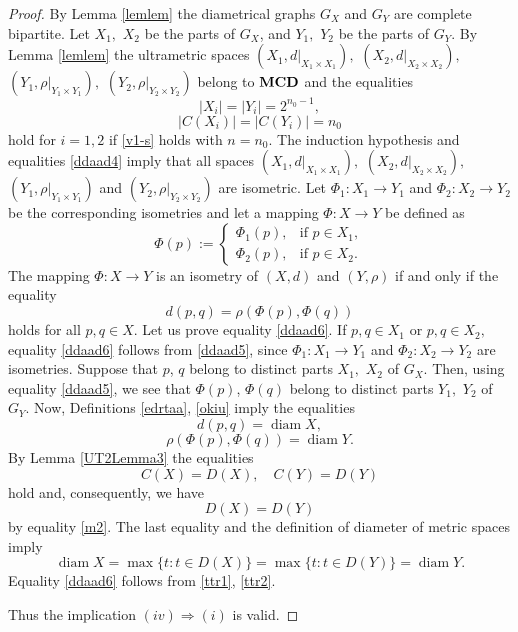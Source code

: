 \documentclass[10pt,a4paper]{amsart}
\begin{document}
\begin{proof}
By Lemma \ref{lemlem} the diametrical graphs
$G_X$ and $G_Y$ are complete bipartite. Let $X_1,$ $X_2$ be the parts of
$G_X$, and $Y_1,$ $Y_2$ be the parts of $G_Y$. By Lemma \ref{lemlem} the
ultrametric spaces
\(
(X_1,d|_{X_1\times X_1}),\)
\((X_2,d|_{X_2\times X_2}),\)
\((Y_1,\rho|_{Y_1\times Y_1}),\)
\((Y_2,\rho|_{Y_2\times Y_2})
\)
belong to ${\bf MCD}$ and the equalities
\begin{equation*}
    |X_i|=|Y_i|=2^{n_0-1},
\end{equation*}
\begin{equation}
    \label{ddaad4}
    |C(X_i)|=|C(Y_i)|=n_0
\end{equation}
hold for $i=1,2$ if \eqref{v1-s} holds with $n=n_0$.
The induction hypothesis and equalities \eqref{ddaad4} imply that all spaces
\(
(X_1,d|_{X_1\times X_1}),
\)
\(
(X_2,d|_{X_2\times X_2}),
\)
\(
(Y_1,\rho|_{Y_1\times Y_1})
\) and \(
(Y_2,\rho|_{Y_2\times Y_2})
\)
are isometric. Let
\(
\Phi_1:X_1\to Y_1
\)
and
\(
\Phi_2:X_2\to Y_2
\)
be the corresponding isometries and let a mapping 
\(
\Phi:X\to Y
\)
be defined as
\begin{equation}
    \label{ddaad5}
\Phi(p):=
\begin{cases}
\Phi_1(p), & \text{if }p\in X_1,\\
\Phi_2(p), & \text{if }p\in X_2.
\end{cases}
\end{equation}
The mapping $\Phi:X\to Y$ is an isometry of $(X,d)$ and $(Y,\rho)$ if and only if the equality
\begin{equation}
    \label{ddaad6}
d(p,q)=\rho(\Phi(p),\Phi(q))
\end{equation}
holds for all $p,q\in X$.
Let us prove equality \eqref{ddaad6}. If
\(
p,q\in X_1 \) or
\( p,q\in X_2,
\)
equality \eqref{ddaad6} follows from \eqref{ddaad5}, since
\(
\Phi_1:X_1\to Y_1
\) and \(
\Phi_2:X_2\to Y_2
\)
are isometries. Suppose that $p$, $q$ belong to distinct parts $X_1,$ $X_2$
of $G_X$. Then, using  equality \eqref{ddaad5}, we see that
\(
\Phi(p)\), \(\Phi(q)
\)
belong to distinct parts $Y_1,$ $Y_2$ of $G_Y$. Now,
Definitions \ref{edrtaa}, \ref{okiu} imply the equalities 
\begin{equation}
    \label{ttr1}
d(p,q)=\operatorname{diam} X,
\end{equation}
\begin{equation}
    \label{ttr2}
\rho(\Phi(p),\Phi(q))
=\operatorname{diam} Y. 
\end{equation}
By Lemma \ref{UT2Lemma3} the equalities
\begin{equation*}
C(X)=D(X),\quad C(Y)=D(Y) 
\end{equation*}
hold and, consequently, we have
\begin{equation*}
    D(X)=D(Y)
\end{equation*}
by equality \eqref{m2}.
The last equality and the definition of diameter of metric spaces imply
\[
\operatorname{diam} X
=
\max\{t:t\in D(X)\}
=
\max\{t:t\in D(Y)\}
=
\operatorname{diam} Y.
\]
Equality \eqref{ddaad6} follows from \eqref{ttr1}, \eqref{ttr2}.

Thus the implication
\(
(iv)\Rightarrow(i)
\)
is valid.
\end{proof}
\end{document}
